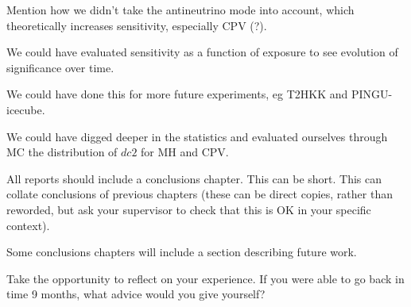 \label{ch:conclusion}
Mention how we didn't take the antineutrino mode into account, which
theoretically increases sensitivity, especially CPV (?).  

We could have evaluated sensitivity as a function of exposure to see evolution
of significance over time.

We could have done this for more future experiments, eg T2HKK and PINGU-icecube.

We could have digged deeper in the statistics and evaluated ourselves through
MC the distribution of $dc2$ for MH and CPV.


All reports should include a conclusions chapter. This can be short. This can collate conclusions of previous chapters (these can be direct copies, rather than reworded, but ask your supervisor to check that this is OK in your specific context).

Some conclusions chapters will include a section describing future work. 

Take the opportunity to reflect on your experience. If you were able to go back in time 9 months, what advice would you give yourself?
